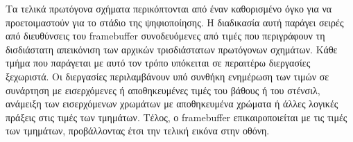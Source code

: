 Τα τελικά πρωτόγονα σχήματα περικόπτονται από έναν καθορισμένο όγκο για να προετοιμαστούν για το στάδιο της ψηφιοποίησης. Η διαδικασία αυτή παράγει σειρές από διευθύνσεις του framebuffer συνοδευόμενες από τιμές που περιγράφουν τη δισδιάστατη απεικόνιση των αρχικών τρισδιάστατων πρωτόγονων σχημάτων. Κάθε τμήμα που παράγεται με αυτό τον τρόπο υπόκειται σε περαιτέρω διεργασίες ξεχωριστά. Οι διεργασίες περιλαμβάνουν υπό συνθήκη ενημέρωση των τιμών σε συνάρτηση με εισερχόμενες ή αποθηκευμένες τιμές του βάθους ή του στένσιλ, ανάμειξη των εισερχόμενων χρωμάτων με αποθηκευμένα χρώματα ή άλλες λογικές πράξεις στις τιμές των τμημάτων. Τέλος, ο framebuffer επικαιροποιείται με τις τιμές των τμημάτων, προβάλλοντας έτσι την τελική εικόνα στην οθόνη.